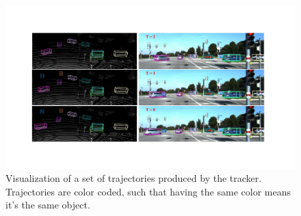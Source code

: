 \documentclass[letterpaper, 10 pt, conference]{ieeeconf}  %
\begin{document}
\begin{figure}\centering
	\vspace{-0.6cm}
	\rule{0pt}{1ex}
	
	\begin{center}
		\includegraphics[trim={3cm, 3cm, 4cm, 3cm}, clip, width=\textwidth]{images/example.pdf}
	\end{center}
	\caption{Visualization of a set of trajectories produced by the tracker. Trajectories are color coded, such that having the same color means it's the same object.}
	\label{fig:examples}
	\vspace{-0.4cm}
\end{figure}

\begin{table}
	\caption{Tracking performance comparison of origin AVOD and our Bi-AVOD on KITTI tracking evaluation datasets.}
	\label{label:result_tracking}
\end{table}
\end{document}
